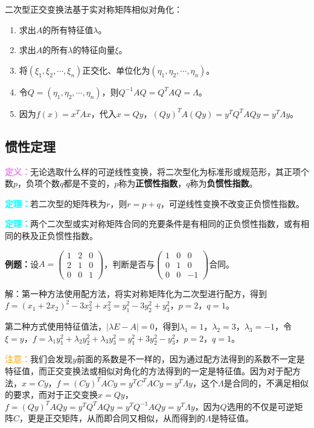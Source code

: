 \documentclass[UTF8, 12pt]{ctexart}
\begin{document}
二次型正交变换法基于实对称矩阵相似对角化：

\begin{enumerate}
    \item 求出$A$的所有特征值$\lambda$。
    \item 求出$A$的所有$\lambda$的特征向量$\xi$。
    \item 将$(\xi_1,\xi_2,\cdots,\xi_n)$正交化、单位化为$(\eta_1,\eta_2,\cdots,\eta_n)$。
    \item 令$Q=(\eta_1,\eta_2,\cdots,\eta_n)$，则$Q^{-1}AQ=Q^TAQ=\Lambda$。
    \item 因为$f(x)=x^TAx$，代入$x=Qy$，$(Qy)^TA(Qy)=y^TQ^TAQy=y^T\Lambda y$。
\end{enumerate}

\subsection{惯性定理}

\textcolor{violet}{\textbf{定义：}}无论选取什么样的可逆线性变换，将二次型化为标准形或规范形，其正项个数$p$，负项个数$q$都是不变的，$p$称为\textbf{正惯性指数}，$q$称为\textbf{负惯性指数}。

\textcolor{aqua}{\textbf{定理：}}若二次型的矩阵秩为$r$，则$r=p+q$，可逆线性变换不改变正负惯性指数。

\textcolor{aqua}{\textbf{定理：}}两个二次型或实对称矩阵合同的充要条件是有相同的正负惯性指数，或有相同的秩及正负惯性指数。

\textbf{例题：}设$A=\left(\begin{array}{ccc}
    1 & 2 & 0 \\
    2 & 1 & 0 \\
    0 & 0 & 1
\end{array}\right)$，判断是否与$\left(\begin{array}{ccc}
    1 & 0 & 0 \\
    0 & 1 & 0 \\
    0 & 0 & -1
\end{array}\right)$合同。

解：第一种方法使用配方法，将实对称矩阵化为二次型进行配方，得到$f=(x_1+2x_2)^2-3x_2^2+x_3^2=y_1^2-3y_2^2+y_3^2$，$p=2$，$q=1$。

第二种方式使用特征值法，$\vert\lambda E-A\vert=0$，得到$\lambda_1=1$，$\lambda_2=3$，$\lambda_3=-1$，令$\xi=y$，$f=\lambda_1y_1^2+\lambda_2y_2^2+\lambda_3y_3^2=y_1^2+3y_2^2-y_3^2$，$p=2$，$q=1$。

\textcolor{orange}{注意：}我们会发现$y$前面的系数是不一样的，因为通过配方法得到的系数不一定是特征值，而正交变换法或相似对角化的方法得到的一定是特征值。因为对于配方法，$x=Cy$，$f=(Cy)^TACy=y^TC^TACy=y^T\Lambda y$，这个$\Lambda$是合同的，不满足相似的要求，而对于正交变换$x=Qy$，$f=(Qy)^TAQy=y^TQ^TAQy=y^TQ^{-1}AQy=y^T\Lambda y$，因为$Q$选用的不仅是可逆矩阵$C$，更是正交矩阵，从而即合同又相似，从而得到的$\Lambda$是特征值。
\end{document}
